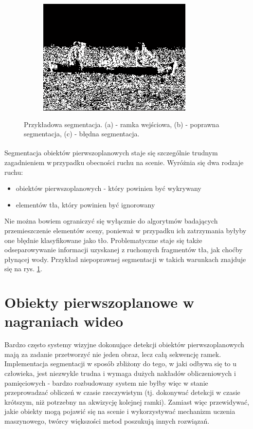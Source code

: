 \begin{figure}[!htb]
\begin{subfigure}[b]{0.3\textwidth}
\includegraphics[width=\textwidth]{img/segBad}
\caption{\label{fig:segBad}}
\end{subfigure}
\caption{Przykładowa segmentacja. (a) - ramka wejściowa, (b) - poprawna segmentacja, (c) - błędna segmentacja. \label{fig:segmentacja}}
\end{figure}

\paragraph{}
Segmentacja obiektów pierwszoplanowych staje się szczególnie trudnym zagadnieniem w\,przypadku obecności ruchu na scenie. Wyróżnia się dwa rodzaje ruchu:
\begin{itemize}
\item obiektów pierwszoplanowych - który powinien być wykrywany
\item elementów tła, który powinien być ignorowany
\end{itemize}
Nie można bowiem ograniczyć się wyłącznie do algorytmów badających przemieszczenie elementów sceny, ponieważ w przypadku ich zatrzymania byłyby one błędnie klasyfikowane jako tło. Problematyczne staje się także odseparowywanie informacji uzyskanej z ruchomych fragmentów tła, jak choćby płynącej wody. Przykład niepoprawnej segmentacji w takich warunkach znajduje się na rys. \ref{fig:segBad}.

\section{Obiekty pierwszoplanowe w nagraniach wideo}
Bardzo często systemy wizyjne dokonujące detekcji obiektów pierwszoplanowych mają za zadanie przetworzyć nie jeden obraz, lecz całą sekwencję ramek. Implementacja segmentacji w sposób zbliżony do tego, w jaki odbywa się to u człowieka, jest niezwykle trudna i wymaga dużych nakładów obliczeniowych i pamięciowych - bardzo rozbudowany system nie byłby więc w stanie przeprowadzać obliczeń w czasie rzeczywistym (tj. dokonywać detekcji w czasie krótszym, niż potrzebny na akwizycję kolejnej ramki). Zamiast więc przewidywać, jakie obiekty mogą pojawić się na scenie i wykorzystywać mechanizm uczenia maszynowego, twórcy większości metod poszukują innych rozwiązań.
